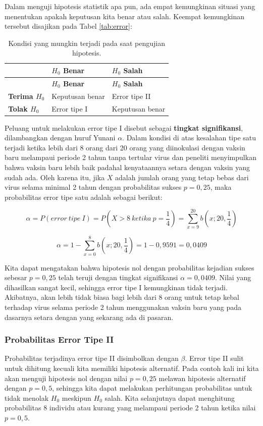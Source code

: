 \documentclass[]{book}
\begin{document}
Dalam menguji hipotesis statistik apa pun, ada empat kemungkinan situasi
yang menentukan apakah keputusan kita benar atau salah. Keempat
kemungkinan tersebut disajikan pada Tabel \ref{tab:error}:

\begin{longtable}[]{@{}lll@{}}
\caption{\label{tab:oparitmatika} Kondisi yang mungkin terjadi pada saat
pengujian hipotesis.}\tabularnewline
\toprule
& \textbf{\(H_0\) Benar} & \textbf{\(H_0\) Salah}\tabularnewline
\midrule
\endfirsthead
\toprule
& \textbf{\(H_0\) Benar} & \textbf{\(H_0\) Salah}\tabularnewline
\midrule
\endhead
\textbf{Terima \(H_0\)} & Keputusan benar & Error tipe II\tabularnewline
\textbf{Tolak \(H_0\)} & Error tipe I & Keputusan benar\tabularnewline
\bottomrule
\end{longtable}

Peluang untuk melakukan error tipe I disebut sebagai \textbf{tingkat
signifikansi}, dilambangkan dengan huruf Yunani \(\alpha\). Dalam
kondisi di atas kesalahan tipe satu terjadi ketika lebih dari 8 orang
dari 20 orang yang diinokulasi dengan vaksin baru melampaui periode 2
tahun tanpa tertular virus dan peneliti menyimpulkan bahwa vaksin baru
lebih baik padahal kenyataannya setara dengan vaksin yang sudah ada.
Oleh karena itu, jika \(X\) adalah jumlah orang yang tetap bebas dari
virus selama minimal 2 tahun dengan probabilitas sukses \(p=0,25\), maka
probabilitas error tipe satu adalah sebagai berikut:

\[
\alpha=P\left(error\ tipe\ I\right)=P\left(X>8\ ketika\ p=\frac{1}{4}\right)=\sum_{x=9}^{20}b\left(x;20,\frac{1}{4}\right)
\]

\[
\alpha=1-\sum_{x=0}^8b\left(x;20,\frac{1}{4}\right)=1-0,9591=0,0409
\]

Kita dapat mengatakan bahwa hipotesis nol dengan probabilitas kejadian
sukses sebesar \(p=0,25\) telah teruji dengan tingkat signifikansi
\(\alpha=0,0409\). Nilai yang dihasilkan sangat kecil, sehingga error
tipe I kemungkinan tidak terjadi. Akibatnya, akan lebih tidak biasa bagi
lebih dari 8 orang untuk tetap kebal terhadap virus selama periode 2
tahun menggunakan vaksin baru yang pada dasarnya setara dengan yang
sekarang ada di pasaran.

\subsubsection{Probabilitas Error Tipe
II}\label{probabilitas-error-tipe-ii}

Probabilitas terjadinya error tipe II disimbolkan dengan \(\beta\).
Error tipe II sulit untuk dihitung kecuali kita memiliki hipotesis
alternatif. Pada contoh kali ini kita akan menguji hipotesis nol dengan
nilai \(p=0,25\) melawan hipotesis alternatif dengan \(p=0,5\), sehingga
kita dapat melakukan perhitungan probabilitas untuk tidak menolak
\(H_0\) meskipun \(H_0\) salah. Kita selanjutnya dapat menghitung
probabilitas 8 individu atau kurang yang melampaui periode 2 tahun
ketika nilai \(p=0,5\).
\end{document}
